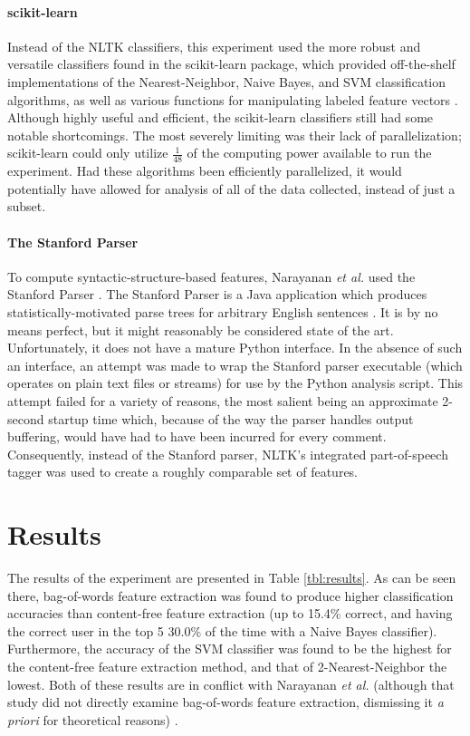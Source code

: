\documentclass{article}
\begin{document}
\paragraph{scikit-learn}
Instead of the NLTK classifiers, this experiment used the more robust and versatile classifiers found in the scikit-learn package, which provided off-the-shelf implementations of the Nearest-Neighbor, Naive Bayes, and SVM classification algorithms, as well as various functions for manipulating labeled feature vectors \cite{pedregosa2011scikit}. Although highly useful and efficient, the scikit-learn classifiers still had some notable shortcomings. The most severely limiting was their lack of parallelization; scikit-learn could only utilize $\frac{1}{48}$ of the computing power available to run the experiment. Had these algorithms been efficiently parallelized, it would potentially have allowed for analysis of all of the data collected, instead of just a subset.

\paragraph{The Stanford Parser}
To compute syntactic-structure-based features, Narayanan \textit{et al.} used the Stanford Parser \cite{narayanan2012feasibility, klein2003accurate}. The Stanford Parser is a Java application which produces statistically-motivated parse trees for arbitrary English sentences \cite{klein2003accurate}. It is by no means perfect, but it might reasonably be considered state of the art. Unfortunately, it does not have a mature Python interface. In the absence of such an interface, an attempt was made to wrap the Stanford parser executable (which operates on plain text files or streams) for use by the Python analysis script. This attempt failed for a variety of reasons, the most salient being an approximate 2-second startup time which, because of the way the parser handles output buffering, would have had to have been incurred for every comment. Consequently, instead of the Stanford parser, NLTK's integrated part-of-speech tagger was used to create a roughly comparable set of features.

\section{Results}

The results of the experiment are presented in Table \ref{tbl:results}. As can be seen there, bag-of-words feature extraction was found to produce higher classification accuracies than content-free feature extraction (up to 15.4\% correct, and having the correct user in the top 5 30.0\% of the time with a Naive Bayes classifier). Furthermore, the accuracy of the SVM classifier was found to be the highest for the content-free feature extraction method, and that of 2-Nearest-Neighbor the lowest. Both of these results are in conflict with Narayanan \textit{et al.} (although that study did not directly examine bag-of-words feature extraction, dismissing it \textit{a priori} for theoretical reasons) \cite{narayanan2012feasibility}.
\end{document}
